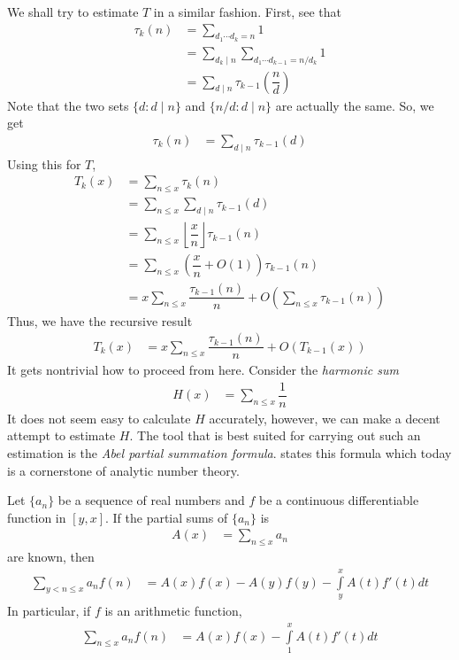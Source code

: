 \documentclass[elemannt.tex]{subfile}
\begin{document}
	We shall try to estimate $T$ in a similar fashion. First, see that
		\begin{align*}
			\tau_{k}(n)
				& = \sum_{d_{1}\cdots d_{k}=n}1\\
				& = \sum_{d_{k}\mid n}\sum_{d_{1}\cdots d_{k-1}=n/d_{k}}1\\
				& = \sum_{d\mid n}\tau_{k-1}\left(\dfrac{n}{d}\right)
		\end{align*}
	Note that the two sets $\{d:d\mid n\}$ and $\{n/d:d\mid n\}$ are actually the same. So, we get
		\begin{align*}
			\tau_{k}(n)
				& = \sum_{d\mid n}\tau_{k-1}(d)
		\end{align*}
	Using this for $T$,
		\begin{align*}
			T_{k}(x)
				& = \sum_{n\leq x}\tau_{k}(n)\\
				& = \sum_{n\leq x}\sum_{d\mid n}\tau_{k-1}(d)\\
				& = \sum_{n\leq x}\left\lfloor{\dfrac{x}{n}}\right\rfloor\tau_{k-1}(n)\\
				& = \sum_{n\leq x}\left(\dfrac{x}{n}+O(1)\right)\tau_{k-1}(n)\\
				& = x\sum_{n\leq x}\dfrac{\tau_{k-1}(n)}{n}+O\left(\sum_{n\leq x}\tau_{k-1}(n)\right)
		\end{align*}
	Thus, we have the recursive result
		\begin{align*}
			T_{k}(x)
				& = x\sum_{n\leq x}\dfrac{\tau_{k-1}(n)}{n}+O(T_{k-1}(x))
		\end{align*}
	It gets nontrivial how to proceed from here. Consider the \textit{harmonic sum}
		\begin{align*}
			H(x)
			& = \sum_{n\leq x}\dfrac{1}{n}
		\end{align*}
	It does not seem easy to calculate $H$ accurately, however, we can make a decent attempt to estimate $H$. The tool that is best suited for carrying out such an estimation is the \textit{Abel partial summation formula}. \textcite{abel_1826} states this formula which today is a cornerstone of analytic number theory.
		\begin{theorem}\label{thm:abel}
			Let $\{a_{n}\}$ be a sequence of real numbers and $f$ be a continuous differentiable function in $[y,x]$. If the partial sums of $\{a_{n}\}$ is
				\begin{align*}
					A(x)
						& = \sum_{n\leq x}a_{n}
				\end{align*}
			are known, then
				\begin{align*}
					\sum_{y<n\leq x}a_{n}f(n)
						& = A(x)f(x)-A(y)f(y)-\int\limits_{y}^{x}A(t)f'(t)dt
				\end{align*}
			In particular, if $f$ is an arithmetic function,
				\begin{align*}
					\sum_{n\leq x}a_{n}f(n)
						& = A(x)f(x)-\int\limits_{1}^{x}A(t)f'(t)dt
				\end{align*}
		\end{theorem}
		
\end{document}
